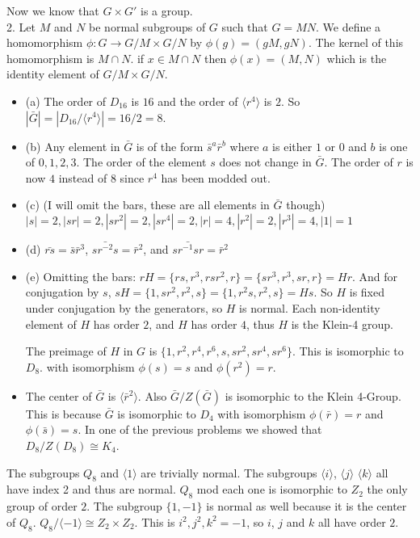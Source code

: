 \documentclass[12pt]{report}
\begin{document}
Now we know that $G \times G'$ is a group.\\

2. Let $M$ and $N$ be normal subgroups of $G$ such that $G = MN$. We define a
homomorphism $\phi: G \to G/M \times G/N$ by $\phi(g) = (gM, gN)$. The kernel of
this homomorphism is $M \cap N$. if $x \in M \cap N$ then $\phi(x) = (M,N)$
which is the identity element of $G/M \times G/N$.\\


\begin{itemize}
  \item (a) The order of $D_16$ is $16$ and the order of $\langle r^4 \rangle$
        is $2$. So $|\bar{G}| = |D_16/\langle r^4 \rangle| = 16/2 = 8$.

  \item (b) Any element in $\bar{G}$ is of the form $\bar{s}^a\bar{r}^b$ where
        $a$ is either $1$ or $0$ and $b$ is one of $0,1,2,3$. The order of the
        element $s$ does not change in $\bar{G}$. The order of $r$ is now $4$
        instead of $8$ since $r^4$ has been modded out.

  \item (c) (I will omit the bars, these are all elements in $\bar{G}$ though)
        ${|s| = 2, |sr| = 2, |sr^2| = 2, |sr^4| = 2, |r| = 4, |r^2| = 2, |r^3|
         = 4, |1| = 1}$

  \item (d) $\bar{rs} = \bar{s}\bar{r}^3$, $\bar{sr^{-2}s} = \bar{r}^2$, and
        $\bar{sr^{-1}sr} = \bar{r}^2$

  \item (e) Omitting the bars: $rH = \{ rs, r^3, rsr^2, r \}= \{ sr^3, r^3, sr,
        r\} = Hr$. And for conjugation by $s$, $sH = \{ 1, sr^2, r^2, s \}=
        \{ 1, r^2s, r^2, s\} = Hs$. So $H$ is fixed under conjugation by the
        generators, so $H$ is normal. Each non-identity element of $H$ has order
        $2$, and $H$ has order $4$, thus $H$ is the Klein-4 group.

        The preimage of $H$ in $G$ is $\{ 1, r^2, r^4, r^6,s,sr^2,sr^4,sr^6 \}$.
        This is isomorphic to $D_8$. with isomorphism $\phi(s) = s$ and
        $\phi(r^2) = r$.

  \item The center of $\bar{G}$ is $\langle \bar{r}^2 \rangle$. Also $\bar{G}/Z
         (\bar{G})$ is isomorphic to the Klein 4-Group. This is because
         $\bar{G}$ is isomorphic to $D_4$ with isomorphism $\phi(\bar{r}) = r$
         and $\phi(\bar{s}) = s$. In one of the previous problems we showed that
         $D_8/Z(D_8) \cong K_4$.


\end{itemize}

 The subgroups $Q_8$ and $\langle 1 \rangle$ are
trivially normal. The subgroups $\langle i \rangle$, $\langle j \rangle$
$\langle k \rangle$ all have index 2 and thus are normal. $Q_8$ mod each one is
isomorphic to $Z_2$ the only group of order $2$. The subgroup $\{ 1, -1 \}$ is
normal as well because it is the center of $Q_8$. $Q_8 / \langle -1 \rangle
\cong Z_2 \times Z_2$. This is $i^2, j^2, k^2 = -1$, so $i$, $j$ and $k$ all
have order $2$.
\end{document}
